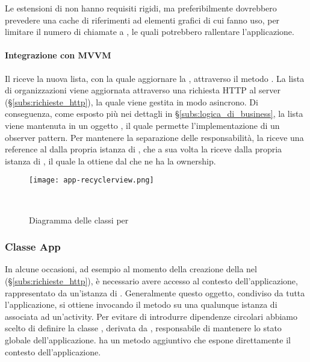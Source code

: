 \documentclass[../../manuale-manutentore.tex]{subfiles}
\begin{document}
Le estensioni di  non hanno requisiti rigidi, ma preferibilmente dovrebbero prevedere una cache di riferimenti ad elementi grafici di cui fanno uso, per limitare il numero di chiamate a , le quali potrebbero rallentare l'applicazione.

\paragraph{Integrazione con MVVM}%
\label{par:integrazione_con_mvvm}

Il  riceve la nuova lista, con la quale aggiornare la , attraverso il metodo .
La lista di organizzazioni viene aggiornata attraverso una richiesta HTTP al server (§\ref{subs:richieste_http}), la quale viene gestita in modo asincrono.
Di conseguenza, come esposto più nei dettagli in §\ref{subs:logica_di_business}, la lista viene mantenuta in un oggetto , il quale permette l'implementazione di un observer pattern.
Per mantenere la separazione delle responsabilità, la  riceve una reference al  dalla propria istanza di , che a sua volta la riceve dalla propria istanza di , il quale la ottiene dal  che ne ha la ownership.

\begin{figure}[h]
  \centering
  \texttt{[image: app-recyclerview.png]}
  \caption{Diagramma delle classi per }
~~\label{fig:app/diagramma_classi_recyclerview}
\end{figure}

\subsubsection{Classe App}%
\label{subs:classe_app}

In alcune occasioni, ad esempio al momento della creazione della  nel  (§\ref{subs:richieste_http}), è necessario avere accesso al contesto dell'applicazione, rappresentato da un'istanza di .
Generalmente questo oggetto, condiviso da tutta l'applicazione, si ottiene invocando il metodo  su una qualunque istanza di  associata ad un'activity.
Per evitare di introdurre dipendenze circolari abbiamo scelto di definire la classe , derivata da , responsabile di mantenere lo stato globale dell'applicazione.
 ha un metodo aggiuntivo  che espone direttamente il contesto dell'applicazione.
\end{document}
